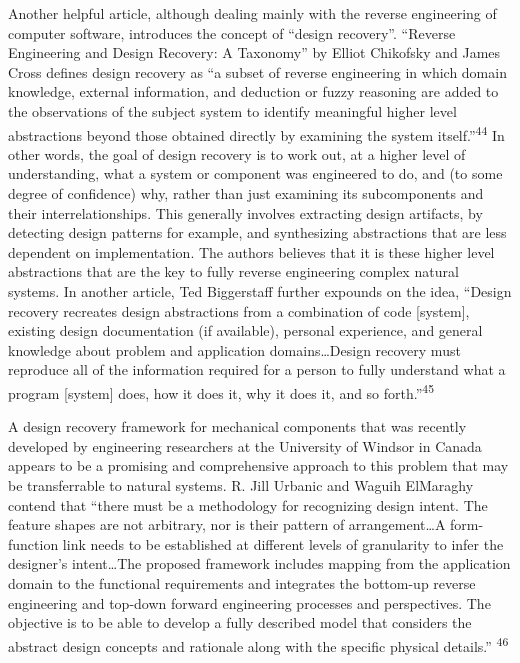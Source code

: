 Another helpful article, although dealing mainly with the reverse
engineering of computer software, introduces the concept of “design
recovery”. “Reverse Engineering and Design Recovery: A Taxonomy” by
Elliot Chikofsky and James Cross defines design recovery as “a subset
of reverse engineering in which domain knowledge, external information,
and deduction or fuzzy reasoning are added to the observations of the
subject system to identify meaningful higher level abstractions beyond
those obtained directly by examining the system
itself.”\textsuperscript{44} In other words, the goal of design
recovery is to work out, at a higher level of understanding, what a
system or component was engineered to do, and (to some degree of
confidence) why, rather than just examining its subcomponents and their
interrelationships. This generally involves extracting design
artifacts, by detecting design patterns for example, and synthesizing
abstractions that are less dependent on implementation. The authors
believes that it is these higher level abstractions that are the key to
fully reverse engineering complex natural systems. In another article,
Ted Biggerstaff further expounds on the idea, “Design recovery
recreates design abstractions from a combination of code [system],
existing design documentation (if available), personal experience, and
general knowledge about problem and application domains…Design recovery
must reproduce all of the information required for a person to fully
understand what a program [system] does, how it does it, why it does
it, and so forth.”\textsuperscript{45}


A design recovery framework for mechanical components that was recently
developed by engineering researchers at the University of Windsor in
Canada appears to be a promising and comprehensive approach to this
problem that may be transferrable to natural systems. R. Jill Urbanic
and Waguih ElMaraghy contend that “there must be a methodology for
recognizing design intent. The feature shapes are not arbitrary, nor is
their pattern of arrangement…A form-function link needs to be
established at different levels of granularity to infer the designer’s
intent…The proposed framework includes mapping from the application
domain to the functional requirements and integrates the bottom-up
reverse engineering and top-down forward engineering processes and
perspectives. The objective is to be able to develop a fully described
model that considers the abstract design concepts and rationale along
with the specific physical details.”\textsuperscript{ 46}


